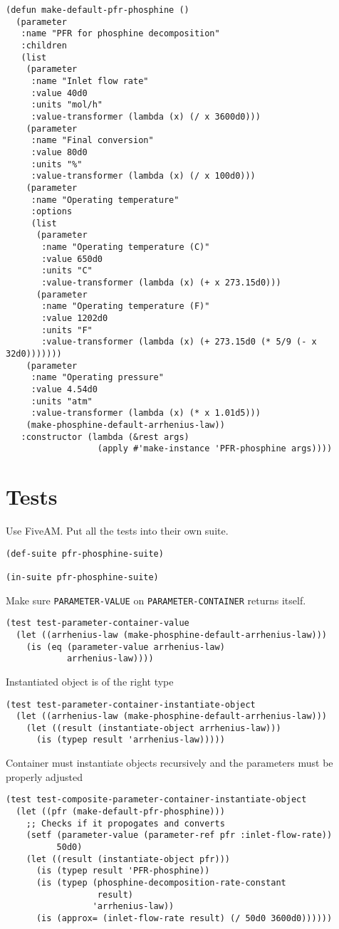 \documentclass[listings, a4paper, fleqn, pdftex, 12pt, openany, oneside, final]{memoir}
\theoremstyle{definition}
\begin{document}
\begin{verbatim}
(defun make-default-pfr-phosphine ()
  (parameter
   :name "PFR for phosphine decomposition"
   :children
   (list
    (parameter
     :name "Inlet flow rate"
     :value 40d0
     :units "mol/h"
     :value-transformer (lambda (x) (/ x 3600d0)))
    (parameter
     :name "Final conversion"
     :value 80d0
     :units "%"
     :value-transformer (lambda (x) (/ x 100d0)))
    (parameter
     :name "Operating temperature"
     :options
     (list
      (parameter
       :name "Operating temperature (C)"
       :value 650d0
       :units "C"
       :value-transformer (lambda (x) (+ x 273.15d0)))
      (parameter
       :name "Operating temperature (F)"
       :value 1202d0
       :units "F"
       :value-transformer (lambda (x) (+ 273.15d0 (* 5/9 (- x 32d0)))))))
    (parameter
     :name "Operating pressure"
     :value 4.54d0
     :units "atm"
     :value-transformer (lambda (x) (* x 1.01d5)))
    (make-phosphine-default-arrhenius-law))
   :constructor (lambda (&rest args)
                  (apply #'make-instance 'PFR-phosphine args))))
\end{verbatim}

\section{Tests}
\label{sec:orgheadline7}
Use FiveAM. Put all the tests into their own suite.
\begin{verbatim}
(def-suite pfr-phosphine-suite)

(in-suite pfr-phosphine-suite)
\end{verbatim}

Make sure \texttt{PARAMETER-VALUE} on \texttt{PARAMETER-CONTAINER} returns itself.
\begin{verbatim}
(test test-parameter-container-value
  (let ((arrhenius-law (make-phosphine-default-arrhenius-law)))
    (is (eq (parameter-value arrhenius-law)
            arrhenius-law))))
\end{verbatim}

Instantiated object is of the right type
\begin{verbatim}
(test test-parameter-container-instantiate-object
  (let ((arrhenius-law (make-phosphine-default-arrhenius-law)))
    (let ((result (instantiate-object arrhenius-law)))
      (is (typep result 'arrhenius-law)))))
\end{verbatim}

Container must instantiate objects recursively and the parameters
must be properly adjusted
\begin{verbatim}
(test test-composite-parameter-container-instantiate-object
  (let ((pfr (make-default-pfr-phosphine)))
    ;; Checks if it propogates and converts
    (setf (parameter-value (parameter-ref pfr :inlet-flow-rate))
          50d0)
    (let ((result (instantiate-object pfr)))
      (is (typep result 'PFR-phosphine))
      (is (typep (phosphine-decomposition-rate-constant
                  result)
                 'arrhenius-law))
      (is (approx= (inlet-flow-rate result) (/ 50d0 3600d0))))))
\end{verbatim}
\end{document}
